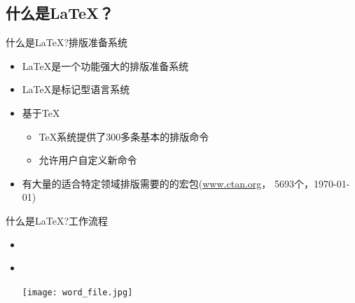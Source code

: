\documentclass[xcolor=svgnames, t, aspectratio=169]{ctexbeamer}
\begin{document}
\subsection[是什么？]{什么是\LaTeX ？}\label{sec01-02}
\begin{frame}[t]{什么是\LaTeX?}{排版准备系统}
  \stretchon
  \begin{itemize}
  \item \LaTeX{}是一个功能强大的排版准备系统
  \item \LaTeX{}是标记型语言系统
  \item 基于\TeX
    \begin{itemize}
    \item \TeX{}系统提供了300多条基本的排版命令
    \item 允许用户自定义新命令
    \end{itemize}
  \item 有大量的适合特定领域排版需要的的宏包(\url{www.ctan.org}，
    \alert{5693}个，\today )
  \end{itemize}
  \stretchoff
\end{frame}

\begin{frame}[t]{什么是\LaTeX?}{工作流程}
  \begin{itemize}
  \item \wysiwym\\[4ex]
    \begin{center}
    \end{center}
    \vspace{4ex}
  \item \wysiwyg\\[4ex]
    \begin{center}
      \texttt{[image: word\_file.jpg]}
    \end{center}
  \end{itemize}
\end{frame}
\end{document}

